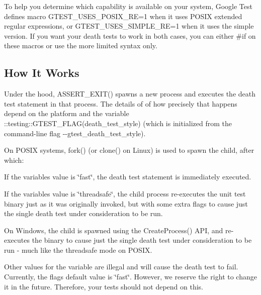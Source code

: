 To help you determine which capability is available on your system, Google Test defines macro {\ttfamily G\+T\+E\+S\+T\+\_\+\+U\+S\+E\+S\+\_\+\+P\+O\+S\+I\+X\+\_\+\+RE=1} when it uses P\+O\+S\+IX extended regular expressions, or {\ttfamily G\+T\+E\+S\+T\+\_\+\+U\+S\+E\+S\+\_\+\+S\+I\+M\+P\+L\+E\+\_\+\+RE=1} when it uses the simple version. If you want your death tests to work in both cases, you can either {\ttfamily \#if} on these macros or use the more limited syntax only.

\subsection*{How It Works}

Under the hood, {\ttfamily A\+S\+S\+E\+R\+T\+\_\+\+E\+X\+I\+T()} spawns a new process and executes the death test statement in that process. The details of of how precisely that happens depend on the platform and the variable {\ttfamily \+::testing\+::\+G\+T\+E\+S\+T\+\_\+\+F\+L\+A\+G(death\+\_\+test\+\_\+style)} (which is initialized from the command-\/line flag {\ttfamily -\/-\/gtest\+\_\+death\+\_\+test\+\_\+style}).


\begin{DoxyItemize}
\item On P\+O\+S\+IX systems, {\ttfamily fork()} (or {\ttfamily clone()} on Linux) is used to spawn the child, after which\+:
\begin{DoxyItemize}
\item If the variable\textquotesingle{}s value is {\ttfamily \char`\"{}fast\char`\"{}}, the death test statement is immediately executed.
\item If the variable\textquotesingle{}s value is {\ttfamily \char`\"{}threadsafe\char`\"{}}, the child process re-\/executes the unit test binary just as it was originally invoked, but with some extra flags to cause just the single death test under consideration to be run.
\end{DoxyItemize}
\item On Windows, the child is spawned using the {\ttfamily Create\+Process()} A\+PI, and re-\/executes the binary to cause just the single death test under consideration to be run -\/ much like the {\ttfamily threadsafe} mode on P\+O\+S\+IX.
\end{DoxyItemize}

Other values for the variable are illegal and will cause the death test to fail. Currently, the flag\textquotesingle{}s default value is {\ttfamily \char`\"{}fast\char`\"{}}. However, we reserve the right to change it in the future. Therefore, your tests should not depend on this.

